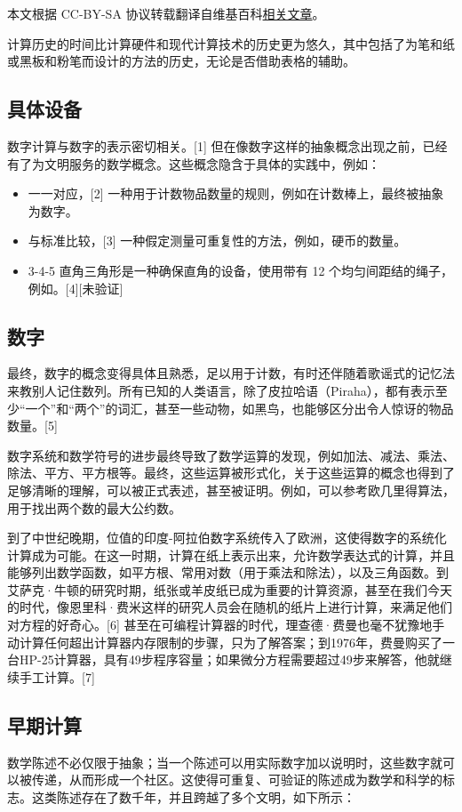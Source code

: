 
本文根据 CC-BY-SA 协议转载翻译自维基百科\href{https://en.wikipedia.org/wiki/History_of_computing}{相关文章}。

计算历史的时间比计算硬件和现代计算技术的历史更为悠久，其中包括了为笔和纸或黑板和粉笔而设计的方法的历史，无论是否借助表格的辅助。
\subsection{具体设备}  
数字计算与数字的表示密切相关。[1] 但在像数字这样的抽象概念出现之前，已经有了为文明服务的数学概念。这些概念隐含于具体的实践中，例如：
\begin{itemize}
\item 一一对应，[2] 一种用于计数物品数量的规则，例如在计数棒上，最终被抽象为数字。
\item 与标准比较，[3] 一种假定测量可重复性的方法，例如，硬币的数量。
\item 3-4-5 直角三角形是一种确保直角的设备，使用带有 12 个均匀间距结的绳子，例如。[4][未验证]
\end{itemize}
\subsection{数字}  
最终，数字的概念变得具体且熟悉，足以用于计数，有时还伴随着歌谣式的记忆法来教别人记住数列。所有已知的人类语言，除了皮拉哈语（Piraha），都有表示至少“一个”和“两个”的词汇，甚至一些动物，如黑鸟，也能够区分出令人惊讶的物品数量。[5]

数字系统和数学符号的进步最终导致了数学运算的发现，例如加法、减法、乘法、除法、平方、平方根等。最终，这些运算被形式化，关于这些运算的概念也得到了足够清晰的理解，可以被正式表述，甚至被证明。例如，可以参考欧几里得算法，用于找出两个数的最大公约数。

到了中世纪晚期，位值的印度-阿拉伯数字系统传入了欧洲，这使得数字的系统化计算成为可能。在这一时期，计算在纸上表示出来，允许数学表达式的计算，并且能够列出数学函数，如平方根、常用对数（用于乘法和除法），以及三角函数。到艾萨克·牛顿的研究时期，纸张或羊皮纸已成为重要的计算资源，甚至在我们今天的时代，像恩里科·费米这样的研究人员会在随机的纸片上进行计算，来满足他们对方程的好奇心。[6] 甚至在可编程计算器的时代，理查德·费曼也毫不犹豫地手动计算任何超出计算器内存限制的步骤，只为了解答案；到1976年，费曼购买了一台HP-25计算器，具有49步程序容量；如果微分方程需要超过49步来解答，他就继续手工计算。[7]
\subsection{早期计算}  
数学陈述不必仅限于抽象；当一个陈述可以用实际数字加以说明时，这些数字就可以被传递，从而形成一个社区。这使得可重复、可验证的陈述成为数学和科学的标志。这类陈述存在了数千年，并且跨越了多个文明，如下所示：

